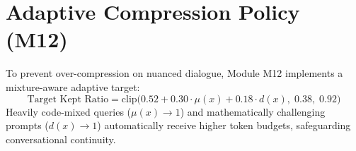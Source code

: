 \section{Adaptive Compression Policy (M12)}
To prevent over-compression on nuanced dialogue, Module M12 implements a mixture-aware adaptive target:
\begin{equation}
    \text{Target Kept Ratio} = \text{clip}\Big( 0.52 + 0.30 \cdot \mu(x) + 0.18 \cdot d(x), \; 0.38, \; 0.92 \Big)
\end{equation}
Heavily code-mixed queries ($\mu(x) \to 1$) and mathematically challenging prompts ($d(x) \to 1$) automatically receive higher token budgets, safeguarding conversational continuity.
